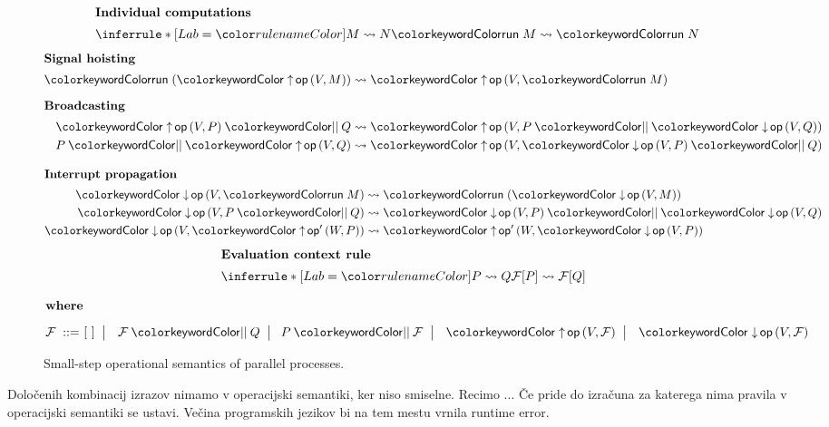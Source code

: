 \documentclass[12pt,a4paper,twoside]{article}
\theoremstyle{definition} %
\theoremstyle{plain} %
\numberwithin{equation}{section}  %
\begin{document}
\begin{figure}[tp]
	\parbox{\textwidth}{
		\centering
		\small
		\begin{minipage}[t]{0.4\textwidth}
			\centering
			\begin{align*}
			\intertext{\textbf{Individual computations}}
			\coopinfer{}{
				M \reduces N
			}{
				\tmrun M \reduces \tmrun N
			}
			\end{align*}
			\begin{align*}
			\intertext{\textbf{Signal hoisting}}
			\tmrun {(\tmopout{op}{V}{M})}  &\reduces \tmopout{op}{V}{\tmrun M}
			\\[1ex]
			\intertext{\textbf{Broadcasting}}
			\tmpar{\tmopout{op}{V}{P}}{Q} &\reduces \tmopout{op}{V}{\tmpar{P}{\tmopin{op}{V}{Q}}}
			\\
			\tmpar{P}{\tmopout{op}{V}{Q}} &\reduces \tmopout{op}{V}{\tmpar{\tmopin{op}{V}{P}}{Q}}
			\end{align*}
			\vspace{-1ex}
		\end{minipage}
		\qquad
		\begin{minipage}[t]{0.4\textwidth}
			\centering
			\begin{align*}
			\intertext{\textbf{Interrupt propagation}}
			\tmopin{op}{V}{\tmrun M} &\reduces \tmrun {(\tmopin{op}{V}{M})}
			\\
			\tmopin{op}{V}{\tmpar P Q} &\reduces \tmpar {\tmopin{op}{V}{P}} {\tmopin{op}{V}{Q}}
			\\
			\tmopin{op}{V}{\tmopout{op'}{W}{P}} &\reduces \tmopout{op'}{W}{\tmopin{op}{V}{P}}
			\end{align*}
			\begin{align*}
			\intertext{\quad\textbf{Evaluation context rule}}
			\quad
			\coopinfer{}{
				P \reduces Q
			}{
				\F[P] \reduces \F[Q]
			}
			\end{align*}
		\end{minipage}
		\begin{align*}
		\intertext{\textbf{where}\vspace{1ex}}
		\text{$\F$}
		\bnfis& [~]
		\bnfor \tmpar \F Q \bnfor\! \tmpar P \F
		\bnfor \tmopout{op}{V}{\F}
		\bnfor \tmopin{op}{V}{\F}
		\end{align*}
	} 
	\caption{Small-step operational semantics of parallel processes.}
	\label{fig:processes}
\end{figure}



Določenih kombinacij izrazov nimamo v operacijski semantiki, ker niso smiselne. Recimo ...
Če \lae pride do izračuna za katerega nima pravila v operacijski semantiki se ustavi. Večina programskih jezikov bi na tem mestu vrnila runtime error.
\end{document}
